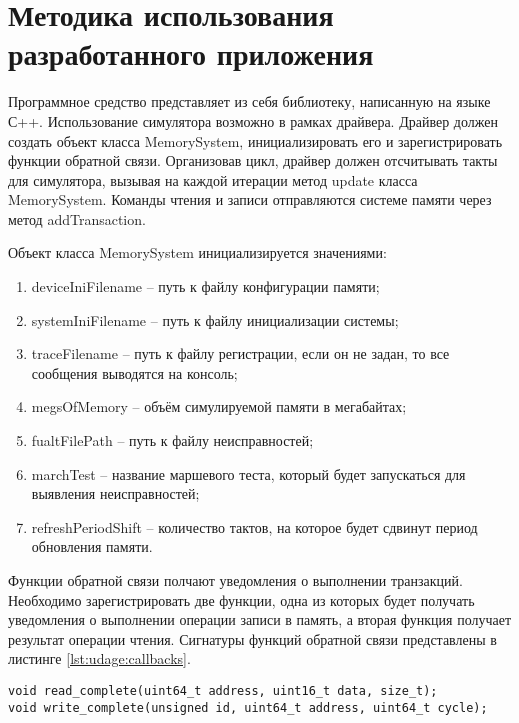 \section[Методика использования разработанного приложения]{Методика использования\\ разработанного приложения}
\label{sec:usage}

Программное средство представляет из себя библиотеку, написанную на языке С++. Использование симулятора возможно в рамках драйвера. Драйвер должен создать объект класса MemorySystem, инициализировать его и зарегистрировать функции обратной связи. Организовав цикл, драйвер должен отсчитывать такты для симулятора, вызывая на каждой итерации метод update класса MemorySystem. Команды чтения и записи отправляются системе памяти через метод addTransaction.

Объект класса MemorySystem инициализируется значениями:

\begin{enumerate}
\item deviceIniFilename -- путь к файлу конфигурации памяти;
\item systemIniFilename -- путь к файлу инициализации системы;
\item traceFilename -- путь к файлу регистрации, если он не задан, то все сообщения выводятся на консоль;
\item megsOfMemory -- объём симулируемой памяти в мегабайтах;
\item fualtFilePath -- путь к файлу неисправностей;
\item marchTest -- название маршевого теста, который будет запускаться для выявления неисправностей;
\item refreshPeriodShift -- количество тактов, на которое будет сдвинут период обновления памяти.
\end{enumerate}

Функции обратной связи полчают уведомления о выполнении транзакций. Необходимо зарегистрировать две функции, одна из которых будет получать уведомления о выполнении операции записи в память, а вторая функция получает результат операции чтения. Сигнатуры функций обратной связи представлены в листинге \ref{lst:udage:callbacks}.

\begin{lstlisting}[style=cplusplusstyle, caption={Сигнатуры функций обратного вызова}, label=lst:udage:callbacks]
void read_complete(uint64_t address, uint16_t data, size_t);
void write_complete(unsigned id, uint64_t address, uint64_t cycle);
\end{lstlisting}

